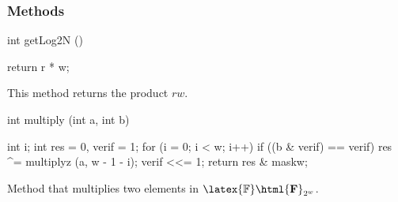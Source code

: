 \subsubsection* {Methods}
\begin{code}

   int getLog2N ()\begin{hide}
   {
      return r * w;
   }\end{hide}
\end{code}
 \begin{tabb}
  This method returns the product $rw$.
 \end{tabb}
\begin{code}

   int multiply (int a, int b)\begin{hide}

   {
      int i;
      int res = 0, verif = 1;
      for (i = 0; i < w; i++) {
         if ((b & verif) == verif)
            res ^= multiplyz (a, w - 1 - i);
         verif <<= 1;
      }
      return res & maskw;
   }\end{hide}
\end{code}
 \begin{tabb}
  Method that multiplies two elements in
 $\latex{\mathbb{F}}\html{\mathbf{F}}_{2^w}$.
 \end{tabb}
